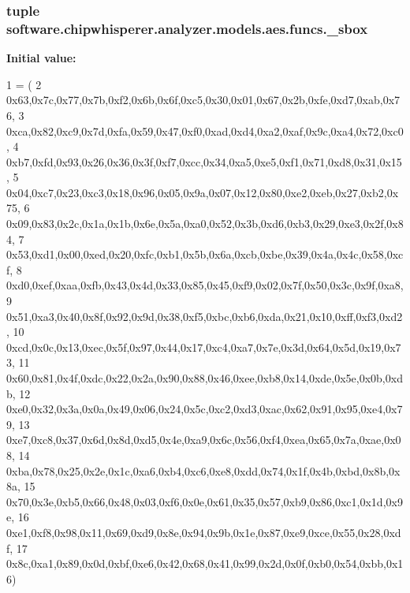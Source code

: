 \subsubsection[{\+\_\+sbox}]{\setlength{\rightskip}{0pt plus 5cm}tuple software.\+chipwhisperer.\+analyzer.\+models.\+aes.\+funcs.\+\_\+sbox}\label{namespacesoftware_1_1chipwhisperer_1_1analyzer_1_1models_1_1aes_1_1funcs_a2cd6538808d4909bc9be0b9a87bc8f1d}
{\bfseries Initial value\+:}
\begin{DoxyCode}
1 = (
2 0x63,0x7c,0x77,0x7b,0xf2,0x6b,0x6f,0xc5,0x30,0x01,0x67,0x2b,0xfe,0xd7,0xab,0x76,
3 0xca,0x82,0xc9,0x7d,0xfa,0x59,0x47,0xf0,0xad,0xd4,0xa2,0xaf,0x9c,0xa4,0x72,0xc0,
4 0xb7,0xfd,0x93,0x26,0x36,0x3f,0xf7,0xcc,0x34,0xa5,0xe5,0xf1,0x71,0xd8,0x31,0x15,
5 0x04,0xc7,0x23,0xc3,0x18,0x96,0x05,0x9a,0x07,0x12,0x80,0xe2,0xeb,0x27,0xb2,0x75,
6 0x09,0x83,0x2c,0x1a,0x1b,0x6e,0x5a,0xa0,0x52,0x3b,0xd6,0xb3,0x29,0xe3,0x2f,0x84,
7 0x53,0xd1,0x00,0xed,0x20,0xfc,0xb1,0x5b,0x6a,0xcb,0xbe,0x39,0x4a,0x4c,0x58,0xcf,
8 0xd0,0xef,0xaa,0xfb,0x43,0x4d,0x33,0x85,0x45,0xf9,0x02,0x7f,0x50,0x3c,0x9f,0xa8,
9 0x51,0xa3,0x40,0x8f,0x92,0x9d,0x38,0xf5,0xbc,0xb6,0xda,0x21,0x10,0xff,0xf3,0xd2,
10 0xcd,0x0c,0x13,0xec,0x5f,0x97,0x44,0x17,0xc4,0xa7,0x7e,0x3d,0x64,0x5d,0x19,0x73,
11 0x60,0x81,0x4f,0xdc,0x22,0x2a,0x90,0x88,0x46,0xee,0xb8,0x14,0xde,0x5e,0x0b,0xdb,
12 0xe0,0x32,0x3a,0x0a,0x49,0x06,0x24,0x5c,0xc2,0xd3,0xac,0x62,0x91,0x95,0xe4,0x79,
13 0xe7,0xc8,0x37,0x6d,0x8d,0xd5,0x4e,0xa9,0x6c,0x56,0xf4,0xea,0x65,0x7a,0xae,0x08,
14 0xba,0x78,0x25,0x2e,0x1c,0xa6,0xb4,0xc6,0xe8,0xdd,0x74,0x1f,0x4b,0xbd,0x8b,0x8a,
15 0x70,0x3e,0xb5,0x66,0x48,0x03,0xf6,0x0e,0x61,0x35,0x57,0xb9,0x86,0xc1,0x1d,0x9e,
16 0xe1,0xf8,0x98,0x11,0x69,0xd9,0x8e,0x94,0x9b,0x1e,0x87,0xe9,0xce,0x55,0x28,0xdf,
17 0x8c,0xa1,0x89,0x0d,0xbf,0xe6,0x42,0x68,0x41,0x99,0x2d,0x0f,0xb0,0x54,0xbb,0x16)
\end{DoxyCode}
